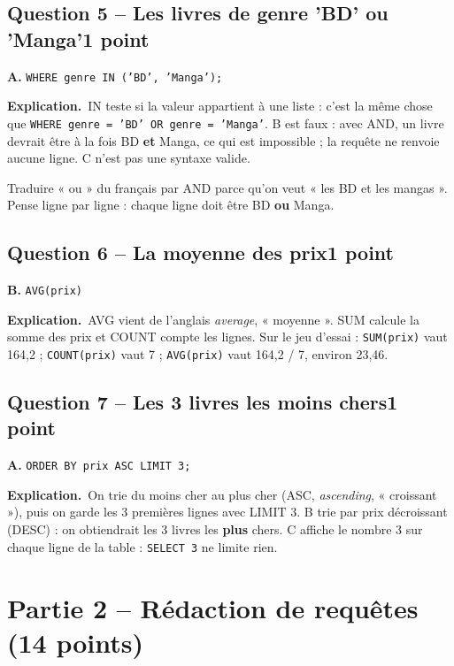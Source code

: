 \documentclass[11pt, a4paper]{exam}
\newcommand{\code}[1]{\texttt{#1}}
\newcommand{\Qt}[2]{\subsection*{#1\hfill{\normalfont\small #2}}}
\newcommand{\explication}{\noindent\textbf{Explication.}\ }
\newcommand{\sql}[1]{\textsc{#1}}
\begin{document}
\Qt{Question 5 -- Les livres de genre 'BD' ou 'Manga'}{1 point}
\begin{reponse}
\textbf{A.} \code{WHERE genre IN ('BD', 'Manga');}
\end{reponse}
\explication \sql{IN} teste si la valeur appartient à une liste : c'est la même chose que \code{WHERE genre = 'BD' OR genre = 'Manga'}. B est faux : avec \sql{AND}, un livre devrait être à la fois BD \textbf{et} Manga, ce qui est impossible ; la requête ne renvoie aucune ligne. C n'est pas une syntaxe valide.

\begin{erreur}
Traduire « ou » du français par \sql{AND} parce qu'on veut « les BD et les mangas ». Pense ligne par ligne : chaque ligne doit être BD \textbf{ou} Manga.
\end{erreur}

\Qt{Question 6 -- La moyenne des prix}{1 point}
\begin{reponse}
\textbf{B.} \code{AVG(prix)}
\end{reponse}
\explication \sql{AVG} vient de l'anglais \textit{average}, « moyenne ». \sql{SUM} calcule la somme des prix et \sql{COUNT} compte les lignes. Sur le jeu d'essai : \code{SUM(prix)} vaut 164,2 ; \code{COUNT(prix)} vaut 7 ; \code{AVG(prix)} vaut 164,2 / 7, environ 23,46.

\Qt{Question 7 -- Les 3 livres les moins chers}{1 point}
\begin{reponse}
\textbf{A.} \code{ORDER BY prix ASC LIMIT 3;}
\end{reponse}
\explication On trie du moins cher au plus cher (\sql{ASC}, \textit{ascending}, « croissant »), puis on garde les 3 premières lignes avec \sql{LIMIT} 3. B trie par prix décroissant (\sql{DESC}) : on obtiendrait les 3 livres les \textbf{plus} chers. C affiche le nombre 3 sur chaque ligne de la table : \code{SELECT 3} ne limite rien.

\section*{Partie 2 -- Rédaction de requêtes (14 points)}
\end{document}
